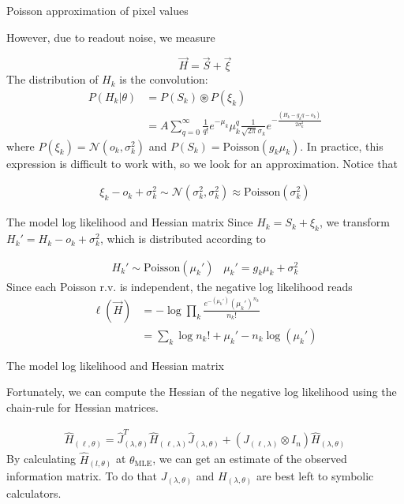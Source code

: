 \documentclass[aspectratio=169]{beamer}
\begin{document}
\begin{frame}{Poisson approximation of pixel values}

However, due to readout noise, we measure

\begin{equation*}
\vec{H} = \vec{S} + \vec{\xi}
\end{equation*}
The distribution of $H_{k}$ is the convolution:
\begin{align*}
P(H_{k}|\theta) &= P(S_{k})\circledast P(\xi_{k})\\
&= A\sum_{q=0}^{\infty} \frac{1}{q!}e^{-\mu_{k}}\mu_{k}^{q}\frac{1}{\sqrt{2\pi}\sigma_{k}}e^{-\frac{(H_{k}-g_{k}q-o_{k})}{2\sigma_{k}^{2}}}
\end{align*}
where $P(\xi_{k}) = \mathcal{N}(o_{k},\sigma_{k}^{2})$ and $P(S_{k}) = \mathrm{Poisson}(g_{k}\mu_{k})$. In practice, this expression is difficult to work with, so we look for an approximation. Notice that 

\begin{align*}
\xi_{k} - o_{k} + \sigma_{k}^{2} \sim \mathcal{N}(\sigma_{k}^{2},\sigma_{k}^{2}) \approx \mathrm{Poisson}(\sigma_{k}^{2})
\end{align*}

\end{frame}

\begin{frame}{The model log likelihood and Hessian matrix}
Since $H_{k} = S_{k} + \xi_{k}$, we transform $H_{k}' = H_{k} - o_{k} + \sigma_{k}^{2}$, which is distributed according to 

\begin{align*}
H_{k}' \sim \mathrm{Poisson}(\mu_{k}')\;\;\;\mu_{k}' = g_{k}\mu_{k} + \sigma_{k}^{2}
\end{align*}
Since each Poisson r.v. is independent, the negative log likelihood reads
\begin{align*}
\ell(\vec{H}) &= -\log \prod_{k} \frac{e^{-\left(\mu_{k}'\right)}\left(\mu_{k}'\right)^{n_{k}}}{n_{k}!}\\
&= \sum_{k}  \log n_{k}! + \mu_{k}' - n_{k}\log\left(\mu_{k}'\right)
\end{align*}

\end{frame}

\begin{frame}{The model log likelihood and Hessian matrix}

Fortunately, we can compute the Hessian of the negative log likelihood using the chain-rule for Hessian matrices.

\begin{align*}
\hat{H}_{(\ell,\theta)} = \hat{J}_{(\lambda,\theta)}^{T} \hat{H}_{(\ell,\lambda)} \hat{J}_{(\lambda,\theta)} + (J_{(\ell,\lambda)}\otimes I_{n})\hat{H}_{(\lambda,\theta)}
\end{align*}
By calculating $\hat{H}_{(l,\theta)}$ at $\theta_{\mathrm{MLE}}$, we can get an estimate of the observed information matrix. To do that $J_{(\lambda,\theta)}$ and $H_{(\lambda,\theta)}$ are best left to symbolic calculators. 
\end{frame}
\end{document}

